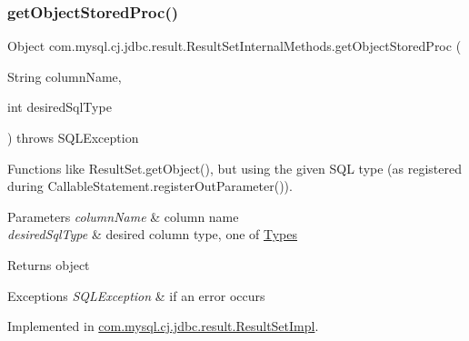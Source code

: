 \subsubsection{\texorpdfstring{get\+Object\+Stored\+Proc()}{getObjectStoredProc()}\hspace{0.1cm}{\footnotesize\ttfamily [3/4]}}
{\footnotesize\ttfamily Object com.\+mysql.\+cj.\+jdbc.\+result.\+Result\+Set\+Internal\+Methods.\+get\+Object\+Stored\+Proc (\begin{DoxyParamCaption}\item[{String}]{column\+Name,  }\item[{int}]{desired\+Sql\+Type }\end{DoxyParamCaption}) throws S\+Q\+L\+Exception}

Functions like Result\+Set.\+get\+Object(), but using the given S\+QL type (as registered during Callable\+Statement.\+register\+Out\+Parameter()).


\begin{DoxyParams}{Parameters}
{\em column\+Name} & column name \\
\hline
{\em desired\+Sql\+Type} & desired column type, one of \mbox{\hyperlink{}{Types}} \\
\hline
\end{DoxyParams}
\begin{DoxyReturn}{Returns}
object 
\end{DoxyReturn}

\begin{DoxyExceptions}{Exceptions}
{\em S\+Q\+L\+Exception} & if an error occurs \\
\hline
\end{DoxyExceptions}


Implemented in \mbox{\hyperlink{classcom_1_1mysql_1_1cj_1_1jdbc_1_1result_1_1_result_set_impl_a8e01634eee20129d559ee3ccfa59b24f}{com.\+mysql.\+cj.\+jdbc.\+result.\+Result\+Set\+Impl}}.

\mbox{\label{interfacecom_1_1mysql_1_1cj_1_1jdbc_1_1result_1_1_result_set_internal_methods_a435054bb5cb1913347350cbbb21fa591}} 
